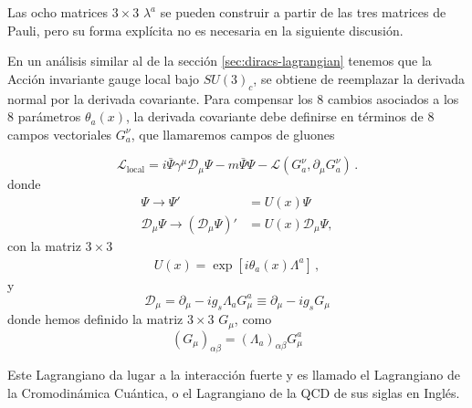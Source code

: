 Las ocho matrices $3\times3$ $\lambda^a$ se pueden construir a partir de las tres matrices de Pauli, pero su forma explícita no es necesaria en la siguiente discusión.

En un análisis similar al de la sección \ref{sec:diracs-lagrangian} tenemos que la Acción invariante gauge local bajo $SU(3)_c$, se obtiene de reemplazar la derivada normal por la derivada covariante. Para compensar los 8 cambios asociados a los 8 parámetros $\theta_a(x)$, la derivada covariante debe definirse en términos de 8 campos vectoriales $G^\nu_a$, que llamaremos campos de gluones
\begin{frame}
\begin{equation}
  \label{eq:127qft}
  \mathcal{L}_{\text{local}}=i\bar{\Psi}\gamma^\mu\mathcal{D}_\mu\Psi-m\bar{\Psi}\Psi
  -\mathcal{L}\left( G^{\nu}_{a},\partial_{\mu}G^{\nu}_{a} \right)\,.%
\end{equation}
donde
\begin{align}
  \label{eq:qcdtr}
  \Psi\to \Psi'&=U(x)\Psi\nonumber\\
  \mathcal{D}_\mu\Psi\to \left(\mathcal{D}_\mu\Psi\right)'&
  =U(x)\mathcal{D}_\mu\Psi,
\end{align}
con la matriz $3\times 3$
\begin{align}
  U(x)=\exp\left[i\theta_a(x){\Lambda^a}\right]\,,
\end{align}
y
\begin{equation}
  \mathcal{D}_\mu=\partial_\mu-i g_s{\Lambda_a}G_\mu^a\equiv\partial_\mu-i g_s {G}_\mu
\end{equation}
donde hemos definido la matriz $3\times 3$  $G_\mu$, como
\begin{equation}
  \left({G}_\mu\right)_{\alpha\beta}=\left( \Lambda_a \right)_{\alpha\beta}G_\mu^a
\end{equation}
\end{frame}
Este Lagrangiano da lugar a la interacción fuerte y es llamado el Lagrangiano de la Cromodinámica Cuántica, o el Lagrangiano de la QCD de sus siglas en Inglés.

